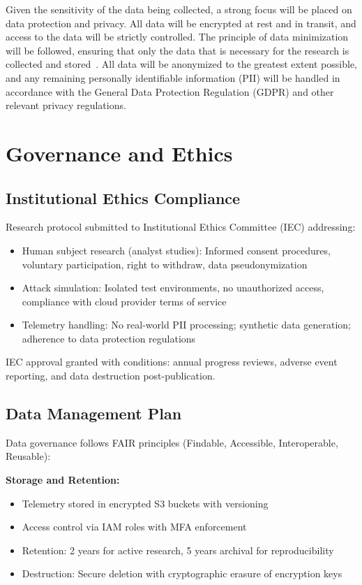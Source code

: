 Given the sensitivity of the data being collected, a strong focus will be placed on data protection and privacy. All data will be encrypted at rest and in transit, and access to the data will be strictly controlled. The principle of data minimization will be followed, ensuring that only the data that is necessary for the research is collected and stored~\cite{commvault2024sharedresponsibility}. All data will be anonymized to the greatest extent possible, and any remaining personally identifiable information (PII) will be handled in accordance with the General Data Protection Regulation (GDPR) and other relevant privacy regulations.

\section{Governance and Ethics}\label{sec:method-ethics}
\subsection{Institutional Ethics Compliance}
Research protocol submitted to Institutional Ethics Committee (IEC) addressing:
\begin{itemize}
    \item Human subject research (analyst studies): Informed consent procedures, voluntary participation, right to withdraw, data pseudonymization
    \item Attack simulation: Isolated test environments, no unauthorized access, compliance with cloud provider terms of service
    \item Telemetry handling: No real-world PII processing; synthetic data generation; adherence to data protection regulations
\end{itemize}

IEC approval granted with conditions: annual progress reviews, adverse event reporting, and data destruction post-publication.

\subsection{Data Management Plan}
Data governance follows FAIR principles (Findable, Accessible, Interoperable, Reusable):

\textbf{Storage and Retention:}
\begin{itemize}
    \item Telemetry stored in encrypted S3 buckets with versioning
    \item Access control via IAM roles with MFA enforcement
    \item Retention: 2 years for active research, 5 years archival for reproducibility
    \item Destruction: Secure deletion with cryptographic erasure of encryption keys
\end{itemize}

